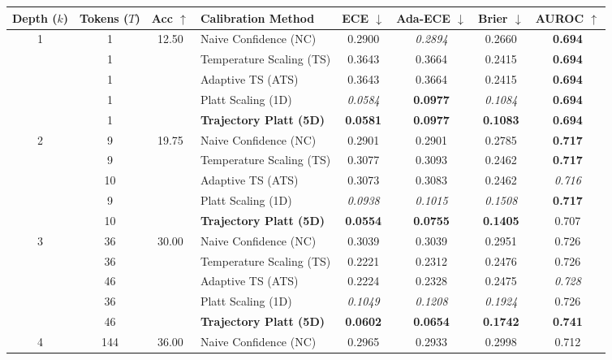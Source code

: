 \begin{table}[t]
\setlength{\tabcolsep}{4pt}
\renewcommand{\arraystretch}{1.05}
\centering
\footnotesize
\begin{tabular}{ccclcccc}
\toprule
\textbf{Depth ($k$)} & \textbf{Tokens ($T$)} & \textbf{Acc} $\uparrow$ & \textbf{Calibration Method} & \textbf{ECE} $\downarrow$ & \textbf{Ada-ECE} $\downarrow$ & \textbf{Brier} $\downarrow$ & \textbf{AUROC} $\uparrow$ \\
\midrule
\multirow{5}{*}{1} & 1 & \multirow{5}{*}{12.50} & Naive Confidence (NC) & 0.2900 & \textit{0.2894} & 0.2660 & \textbf{0.694} \\
 & 1 &  & Temperature Scaling (TS) & 0.3643 & 0.3664 & 0.2415 & \textbf{0.694} \\
 & 1 &  & Adaptive TS (ATS) & 0.3643 & 0.3664 & 0.2415 & \textbf{0.694} \\
 & 1 &  & Platt Scaling (1D) & \textit{0.0584} & \textbf{0.0977} & \textit{0.1084} & \textbf{0.694} \\
 & 1 &  & \textbf{Trajectory Platt (5D)} & \textbf{0.0581} & \textbf{0.0977} & \textbf{0.1083} & \textbf{0.694} \\
\midrule
\multirow{5}{*}{2} & 9 & \multirow{5}{*}{19.75} & Naive Confidence (NC) & 0.2901 & 0.2901 & 0.2785 & \textbf{0.717} \\
 & 9 &  & Temperature Scaling (TS) & 0.3077 & 0.3093 & 0.2462 & \textbf{0.717} \\
 & 10 &  & Adaptive TS (ATS) & 0.3073 & 0.3083 & 0.2462 & \textit{0.716} \\
 & 9 &  & Platt Scaling (1D) & \textit{0.0938} & \textit{0.1015} & \textit{0.1508} & \textbf{0.717} \\
 & 10 &  & \textbf{Trajectory Platt (5D)} & \textbf{0.0554} & \textbf{0.0755} & \textbf{0.1405} & 0.707 \\
\midrule
\multirow{5}{*}{3} & 36 & \multirow{5}{*}{30.00} & Naive Confidence (NC) & 0.3039 & 0.3039 & 0.2951 & 0.726 \\
 & 36 &  & Temperature Scaling (TS) & 0.2221 & 0.2312 & 0.2476 & 0.726 \\
 & 46 &  & Adaptive TS (ATS) & 0.2224 & 0.2328 & 0.2475 & \textit{0.728} \\
 & 36 &  & Platt Scaling (1D) & \textit{0.1049} & \textit{0.1208} & \textit{0.1924} & 0.726 \\
 & 46 &  & \textbf{Trajectory Platt (5D)} & \textbf{0.0602} & \textbf{0.0654} & \textbf{0.1742} & \textbf{0.741} \\
\midrule
\multirow{5}{*}{4} & 144 & \multirow{5}{*}{36.00} & Naive Confidence (NC) & 0.2965 & 0.2933 & 0.2998 & 0.712 \\

\end{tabular}
\end{table}
